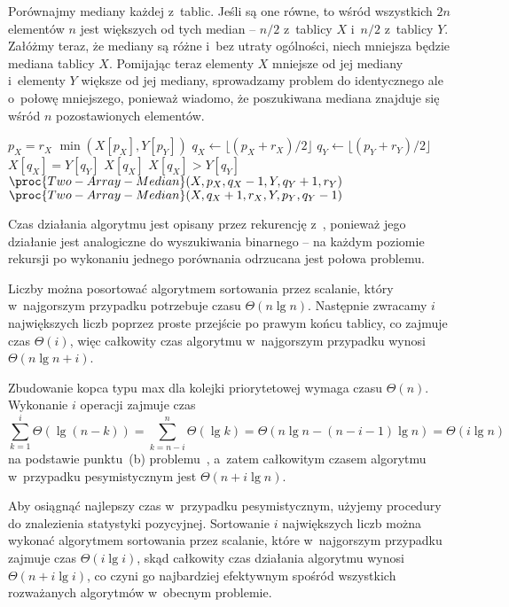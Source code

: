 \exercise %
Porównajmy mediany każdej z~tablic. Jeśli są one równe, to wśród wszystkich $2n$ elementów $n$ jest większych od tych median -- $n/2$ z~tablicy $X$ i~$n/2$ z~tablicy $Y$. Załóżmy teraz, że mediany są różne i~bez utraty ogólności, niech mniejsza będzie mediana tablicy $X$. Pomijając teraz elementy $X$ mniejsze od jej mediany i~elementy $Y$ większe od jej mediany, sprowadzamy problem do identycznego ale o~połowę mniejszego, ponieważ wiadomo, że poszukiwana mediana znajduje się wśród $n$ pozostawionych elementów.
\begin{codebox}
\li	\If $p_X=r_X$
\li		\Then \Return $\min(X[p_X],Y[p_Y])$
		\End
\li	$q_X\gets\lfloor(p_X+r_X)/2\rfloor$
\li	$q_Y\gets\lfloor(p_Y+r_Y)/2\rfloor$
\li	\If $X[q_X]=Y[q_Y]$
\li		\Then \Return $X[q_X]$
		\End
\li	\If $X[q_X]>Y[q_Y]$
\li		\Then \Return $\proc{Two-Array-Median}(X,p_X,q_X-1,Y,q_Y+1,r_Y)$
\li		\Else \Return $\proc{Two-Array-Median}(X,q_X+1,r_X,Y,p_Y,q_Y-1)$
		\End
\end{codebox}

Czas działania algorytmu jest opisany przez rekurencję z~, ponieważ jego działanie jest analogiczne do wyszukiwania binarnego -- na każdym poziomie rekursji po wykonaniu jednego porównania odrzucana jest połowa problemu.

\exercise %

\problems


\subproblem %
Liczby można posortować algorytmem sortowania przez scalanie, który w~najgorszym przypadku potrzebuje czasu $\Theta(n\lg n)$. Następnie zwracamy $i$ największych liczb poprzez proste przejście po prawym końcu tablicy, co zajmuje czas $\Theta(i)$, więc całkowity czas algorytmu w~najgorszym przypadku wynosi $\Theta(n\lg n+i)$.

\subproblem %
Zbudowanie kopca typu max dla kolejki priorytetowej wymaga czasu $\Theta(n)$. Wykonanie $i$ operacji  zajmuje czas
\[
	\sum_{k=1}^i\Theta(\lg(n-k)) = \sum_{k=n-i}^n\Theta(\lg k) = \Theta(n\lg n-(n-i-1)\lg n) = \Theta(i\lg n)
\]
na podstawie punktu~(b) problemu~, a~zatem całkowitym czasem algorytmu w~przypadku pesymistycznym jest $\Theta(n+i\lg n)$.

\subproblem %
Aby osiągnąć najlepszy czas w~przypadku pesymistycznym, użyjemy procedury  do znalezienia  statystyki pozycyjnej. Sortowanie $i$ największych liczb można wykonać algorytmem sortowania przez scalanie, które w~najgorszym przypadku zajmuje czas $\Theta(i\lg i)$, skąd całkowity czas działania algorytmu wynosi $\Theta(n+i\lg i)$, co czyni go najbardziej efektywnym spośród wszystkich rozważanych algorytmów w~obecnym problemie.

